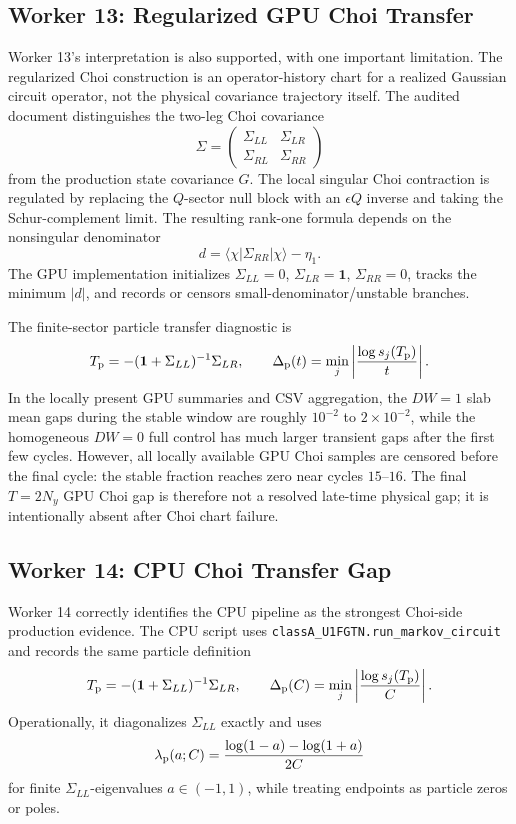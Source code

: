 \documentclass[aps,prb,onecolumn,nofootinbib,superscriptaddress]{revtex4-2}
\newcommand{\I}{\mathbf{1}}
\newcommand{\Tp}{T_{\rm p}}
\newcommand{\SigmaLL}{\Sigma_{LL}}
\newcommand{\SigmaLR}{\Sigma_{LR}}
\begin{document}
\subsection{Worker 13: Regularized GPU Choi Transfer}

Worker 13's interpretation is also supported, with one important limitation.
The regularized Choi construction is an operator-history chart for a realized
Gaussian circuit operator, not the physical covariance trajectory itself.  The
audited document distinguishes the two-leg Choi covariance
\[
  \Sigma =
  \begin{pmatrix}
  \Sigma_{LL} & \Sigma_{LR}\\
  \Sigma_{RL} & \Sigma_{RR}
  \end{pmatrix}
\]
from the production state covariance \(G\).  The local singular Choi
contraction is regulated by replacing the \(Q\)-sector null block with an
\(\epsilon Q\) inverse and taking the Schur-complement limit.  The resulting
rank-one formula depends on the nonsingular denominator
\[
  d=\langle\chi|\Sigma_{RR}|\chi\rangle-\eta_1.
\]
The GPU implementation initializes
\(\Sigma_{LL}=0\), \(\Sigma_{LR}=\I\), \(\Sigma_{RR}=0\), tracks the minimum
\(|d|\), and records or censors small-denominator/unstable branches.

The finite-sector particle transfer diagnostic is
\begin{equation}
  \Tp=-(\I+\SigmaLL)^{-1}\SigmaLR,
  \qquad
  \Delta_{\rm p}(t)=\min_j\left|\frac{\log s_j(\Tp)}{t}\right|.
\end{equation}
In the locally present GPU summaries and CSV aggregation, the \(DW=1\) slab
mean gaps during the stable window are roughly \(10^{-2}\) to
\(2\times10^{-2}\), while the homogeneous \(DW=0\) full control has much larger
transient gaps after the first few cycles.  However, all locally available GPU
Choi samples are censored before the final cycle: the stable fraction reaches
zero near cycles \(15\)--\(16\).  The final \(T=2N_y\) GPU Choi gap is therefore
not a resolved late-time physical gap; it is intentionally absent after Choi
chart failure.

\subsection{Worker 14: CPU Choi Transfer Gap}

Worker 14 correctly identifies the CPU pipeline as the strongest Choi-side
production evidence.  The CPU script uses
\texttt{classA\_U1FGTN.run\_markov\_circuit} and records the same particle
definition
\[
  \Tp=-(\I+\SigmaLL)^{-1}\SigmaLR,
  \qquad
  \Delta_{\rm p}(C)=\min_j\left|\frac{\log s_j(\Tp)}{C}\right|.
\]
Operationally, it diagonalizes \(\SigmaLL\) exactly and uses
\[
  \lambda_{\rm p}(a;C)=
  \frac{\log(1-a)-\log(1+a)}{2C}
\]
for finite \(\SigmaLL\)-eigenvalues \(a\in(-1,1)\), while treating endpoints
as particle zeros or poles.
\end{document}
